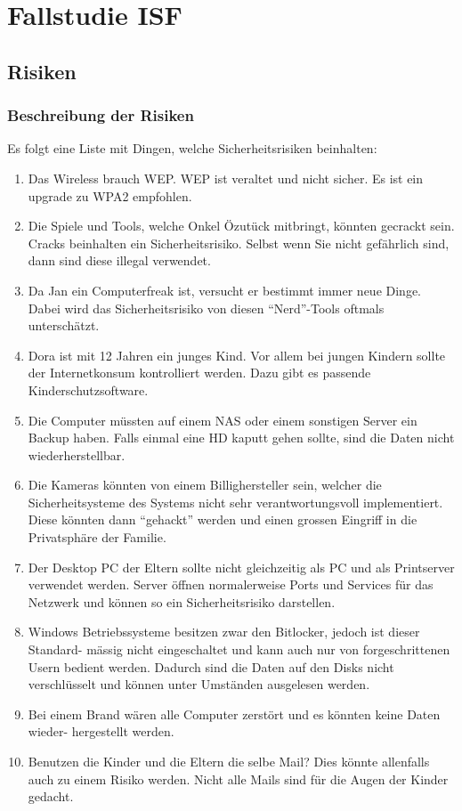 \section{Fallstudie ISF}

\subsection{Risiken}

\subsubsection{Beschreibung der Risiken}

Es folgt eine Liste mit Dingen, welche Sicherheitsrisiken beinhalten:
\begin{enumerate}
\item Das Wireless brauch WEP. WEP ist veraltet und nicht sicher. Es ist ein upgrade
zu WPA2 empfohlen.
\item Die Spiele und Tools, welche Onkel Özutück mitbringt, könnten gecrackt sein.
Cracks beinhalten ein Sicherheitsrisiko. Selbst wenn Sie nicht gefährlich sind, dann
sind diese illegal verwendet.
\item Da Jan ein Computerfreak ist, versucht er bestimmt immer neue Dinge. Dabei wird das Sicherheitsrisiko von diesen “Nerd”-Tools oftmals unterschätzt.
\item Dora ist mit 12 Jahren ein junges Kind. Vor allem bei jungen Kindern sollte der
Internetkonsum kontrolliert werden. Dazu gibt es passende Kinderschutzsoftware.
\item Die Computer müssten auf einem NAS oder einem sonstigen Server ein Backup
haben. Falls einmal eine HD kaputt gehen sollte, sind die Daten nicht wiederherstellbar.
\item Die Kameras könnten von einem Billighersteller sein, welcher die Sicherheitsysteme
des Systems nicht sehr verantwortungsvoll implementiert. Diese könnten dann
“gehackt” werden und einen grossen Eingriff in die Privatsphäre der Familie.
\item Der Desktop PC der Eltern sollte nicht gleichzeitig als PC und als Printserver
verwendet werden. Server öffnen normalerweise Ports und Services für das Netzwerk
und können so ein Sicherheitsrisiko darstellen.
\item Windows Betriebssysteme besitzen zwar den Bitlocker, jedoch ist dieser Standard-
mässig nicht eingeschaltet und kann auch nur von forgeschrittenen Usern bedient
werden. Dadurch sind die Daten auf den Disks nicht verschlüsselt und können unter
Umständen ausgelesen werden.
\item Bei einem Brand wären alle Computer zerstört und es könnten keine Daten wieder-
hergestellt werden.
\item Benutzen die Kinder und die Eltern die selbe Mail? Dies könnte allenfalls auch zu
einem Risiko werden. Nicht alle Mails sind für die Augen der Kinder gedacht.
\end{enumerate}
\newpage

